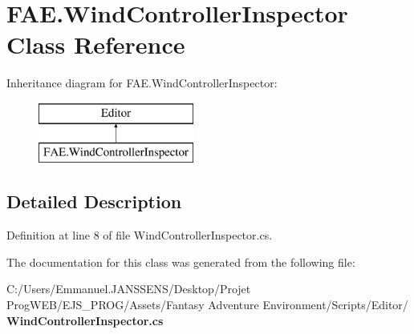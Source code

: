 \section{F\+A\+E.\+Wind\+Controller\+Inspector Class Reference}
\label{class_f_a_e_1_1_wind_controller_inspector}
Inheritance diagram for F\+A\+E.\+Wind\+Controller\+Inspector\+:\begin{figure}[H]
\begin{center}
\leavevmode
\includegraphics[height=2.000000cm]{class_f_a_e_1_1_wind_controller_inspector}
\end{center}
\end{figure}


\subsection{Detailed Description}


Definition at line 8 of file Wind\+Controller\+Inspector.\+cs.



The documentation for this class was generated from the following file\+:\begin{DoxyCompactItemize}
\item 
C\+:/\+Users/\+Emmanuel.\+J\+A\+N\+S\+S\+E\+N\+S/\+Desktop/\+Projet Prog\+W\+E\+B/\+E\+J\+S\+\_\+\+P\+R\+O\+G/\+Assets/\+Fantasy Adventure Environment/\+Scripts/\+Editor/\textbf{ Wind\+Controller\+Inspector.\+cs}\end{DoxyCompactItemize}
